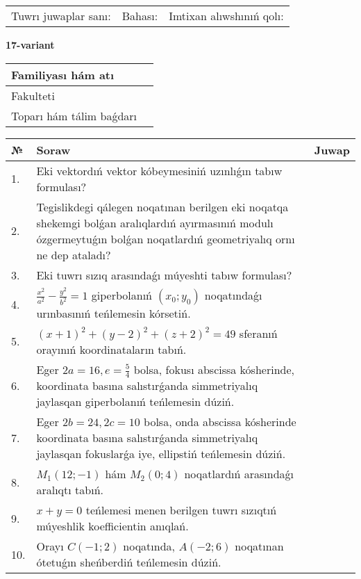 \documentclass{article}
\begin{document}
\vspace{1cm}

\begin{tabular}{lll}
Tuwrı juwaplar sanı: \underline{\hspace{1.5cm}} & 
Bahası: \underline{\hspace{1.5cm}} & 
Imtixan alıwshınıń qolı: \underline{\hspace{2cm}} \\
\end{tabular}

\egroup

\newpage


\textbf{17-variant}\\

\bgroup
\def\arraystretch{1.6} %

\begin{tabular}{|m{5.7cm}|m{9.5cm}|}
\hline
Familiyası hám atı & \\
\hline
Fakulteti  & \\
\hline
Toparı hám tálim baǵdarı  & \\
\hline
\end{tabular}

\vspace{1cm}

\begin{tabular}{|m{0.7cm}|m{10cm}|m{4cm}|}
\hline
№ & Soraw & Juwap \\
\hline
1. & Eki vektordıń vektor kóbeymesiniń uzınlıǵın tabıw formulası? &  \\
\hline
2. & Tegislikdegi qálegen noqatınan berilgen eki noqatqa shekemgi bolǵan aralıqlardıń ayırmasınıń modulı ózgermeytuǵın bolǵan noqatlardıń geometriyalıq ornı ne dep ataladı? &  \\
\hline
3. & Eki tuwrı sızıq arasındaǵı múyeshti tabıw formulası? &  \\
\hline
4. & $\frac{x^2}{a^2}-\frac{y^2}{b^2}=1$ giperbolanıń $(x_0;y_0)$ noqatındaǵı urınbasınıń teńlemesin kórsetiń. &  \\
\hline
5. & $(x+1)^{2}+(y-2) ^{2}+(z+2) ^{2}=49$ sferanıń orayınıń koordinataların tabıń. &  \\
\hline
6. & Eger $2a=16, e=\frac{5}{4}$ bolsa, fokusı abscissa kósherinde, koordinata basına salıstırǵanda simmetriyalıq jaylasqan giperbolanıń teńlemesin dúziń. &  \\
\hline
7. & Eger $2b=24, 2 c=10$ bolsa, onda abscissa kósherinde koordinata basına salıstırǵanda simmetriyalıq jaylasqan fokuslarǵa iye, ellipstiń teńlemesin dúziń. &  \\
\hline
8. & $M_{1} (12;-1)$ hám $M_{2} (0;4)$ noqatlardıń arasındaǵı aralıqtı tabıń. &  \\
\hline
9. & $x+y=0$ teńlemesi menen berilgen tuwrı sızıqtıń múyeshlik koefficientin anıqlań. &  \\
\hline
10. & Orayı $C (-1;2)$ noqatında, $A (-2;6 )$ noqatınan ótetuǵın sheńberdiń teńlemesin dúziń. &  \\
\hline
\end{tabular}
\end{document}
